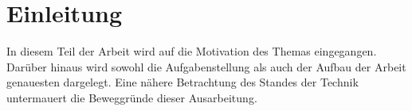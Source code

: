 
\chapter{Einleitung}
\label{chap:Einleitung}
In diesem Teil der Arbeit wird auf die Motivation des Themas eingegangen. Darüber hinaus wird sowohl die Aufgabenstellung als auch der 
Aufbau der Arbeit genauesten dargelegt. Eine nähere Betrachtung des Standes der Technik untermauert die Beweggründe dieser Ausarbeitung.  

